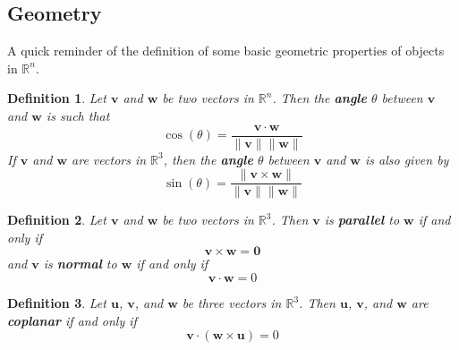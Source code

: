 \documentclass[12pt]{book}
\newcommand{\rbb}{\mathbb{R}}
\theoremstyle{definitionstyle}
\newtheorem{definition}{Definition}[section]
\numberwithin{equation}{section}
\begin{document}
\newpage

\subsection{Geometry}

A quick reminder of the definition of some basic geometric properties of objects in $\rbb^n$.

\begin{definition}\label{angle-dot-cross}
    Let $\mathbf{v}$ and $\mathbf{w}$ be two vectors in $\rbb^n$. Then the \textbf{angle} $\theta$ between $\mathbf{v}$ and $\mathbf{w}$ is such that
    \begin{equation}
         \cos(\theta) = \frac{\mathbf{v} \cdot \mathbf{w}}{\|\mathbf{v}\| \|\mathbf{w}\|}
    \end{equation}
    If $\mathbf{v}$ and $\mathbf{w}$ are vectors in $\rbb^3$, then the \textbf{angle} $\theta$ between $\mathbf{v}$ and $\mathbf{w}$ is also given by
    \begin{equation}
	\sin(\theta) = \frac{\|\mathbf{v} \times \mathbf{w}\|}{\|\mathbf{v}\| \|\mathbf{w}\|}
    \end{equation}
\end{definition}

\vspace{0.5cm}

\begin{definition}
    Let $\mathbf{v}$ and $\mathbf{w}$ be two vectors in $\rbb^3$. Then $\mathbf{v}$ is \textbf{parallel} to $\mathbf{w}$ if and only if 
    \begin{equation}
	\mathbf{v} \times \mathbf{w} = \mathbf{0}
    \end{equation}
    and $\mathbf{v}$ is \textbf{normal} to $\mathbf{w}$ if and only if 
    \begin{equation}
	\mathbf{v} \cdot \mathbf{w} = 0
    \end{equation}	
\end{definition}

\vspace{0.5cm}

\begin{definition}\label{coplanar}
    Let $\mathbf{u}$, $\mathbf{v}$, and $\mathbf{w}$ be three vectors in $\rbb^3$. Then $\mathbf{u}$, $\mathbf{v}$, and $\mathbf{w}$ are \textbf{coplanar} if and only if
    \begin{equation}
	\mathbf{v} \cdot (\mathbf{w} \times \mathbf{u}) = 0
    \end{equation}
\end{definition}
\end{document}
